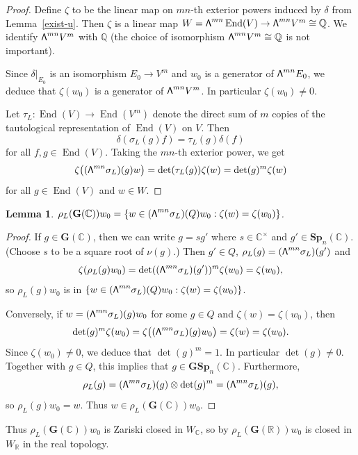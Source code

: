 \documentclass[11pt]{article}
\numberwithin{equation}{section}
\newcommand\bw{{\hbox{\large$\mathsf{\Lambda}$}}}
\newcommand{\bC}{\mathbb{C}}
\newcommand{\bQ}{\mathbb{Q}}
\newcommand{\bR}{\mathbb{R}}
\newcommand{\gG}{\mathbf{G}}
\newcommand{\gGSp}{\mathbf{GSp}}
\newcommand{\gSp}{\mathbf{Sp}}
\DeclareMathOperator{\End}{End}
\let\extpower\bw
\newtheorem{lemma}{Lemma}[section]
\begin{document}
\begin{proof}
Define $\zeta$ to be the linear map on $mn$-th exterior powers induced by $\delta$ from Lemma~\ref{exist-u}.
Then $\zeta$ is a linear map $W = \extpower^{mn} \End(V) \to \extpower^{mn} V^m \cong \bQ$.
We identify $\extpower^{mn} V^m$ with $\bQ$ (the choice of isomorphism $\extpower^{mn} V^m \cong \bQ$ is not important).

Since $\delta|_{E_0}$ is an isomorphism $E_0 \to V^m$ and $w_0$ is a generator of $\extpower^{mn} E_0$, we deduce that $\zeta(w_0)$ is a generator of $\extpower^{mn} V^m$.
In particular $\zeta(w_0) \neq 0$.

Let $\tau_L \colon \End(V) \to \End(V^m)$ denote the direct sum of $m$ copies of the tautological representation of $\End(V)$ on $V$.
Then
\[
\delta(\sigma_L(g)f) = \tau_L(g)\delta(f)
\]
for all $f, g \in \End(V)$.
Taking the $mn$-th exterior power, we get
\[
\zeta \bigl( (\extpower^{mn} \sigma_L)(g)w \bigr) = \det(\tau_L(g)) \zeta(w) = \det(g)^m \zeta(w)
\]
for all $g \in \End(V)$ and $w \in W$.
\end{proof}

\begin{lemma}
$\rho_L(\gG(\bC))w_0 = \{ w \in (\extpower^{mn} \sigma_L)(Q)w_0 : \zeta(w) = \zeta(w_0) \}$.
\end{lemma}

\begin{proof}
If $g \in \gG(\bC)$, then we can write $g = s g'$ where $s \in \bC^\times$ and $g' \in \gSp_n(\bC)$. (Choose $s$ to be a square root of $\nu(g)$.)
Then $g' \in Q$, $\rho_L(g) = (\extpower^{mn} \sigma_L)(g')$ and
\[
\zeta(\rho_L(g)w_0) = \det((\extpower^{mn} \sigma_L)(g'))^m \zeta(w_0) = \zeta(w_0),
\]
so $\rho_L(g)w_0$ is in $\{ w \in (\extpower^{mn} \sigma_L)(Q)w_0 : \zeta(w) = \zeta(w_0) \}$.

Conversely, if $w = (\extpower^{mn} \sigma_L)(g)w_0$ for some $g \in Q$ and $\zeta(w) = \zeta(w_0)$, then
\[
\det(g)^m \zeta(w_0) = \zeta \bigl( (\extpower^{mn} \sigma_L)(g)w_0 \bigr) = \zeta(w) = \zeta(w_0).
\]
Since $\zeta(w_0) \neq 0$, we deduce that $\det(g)^m = 1$.
In particular $\det(g) \neq 0$.
Together with $g \in Q$, this implies that $g \in \gGSp_n(\bC)$.
Furthermore,
\[
\rho_L(g) = (\extpower^{mn} \sigma_L)(g) \otimes \det(g)^m = (\extpower^{mn} \sigma_L)(g),
\]
so $\rho_L(g)w_0 = w$.
Thus $w \in \rho_L(\gG(\bC))w_0$.
\end{proof}

Thus $\rho_L(\gG(\bC))w_0$ is Zariski closed in $W_\bC$, so by \cite[Prop.\,6.3]{BHC62} $\rho_L(\gG(\bR))w_0$ is closed in $W_\bR$ in the real topology.
\end{document}
